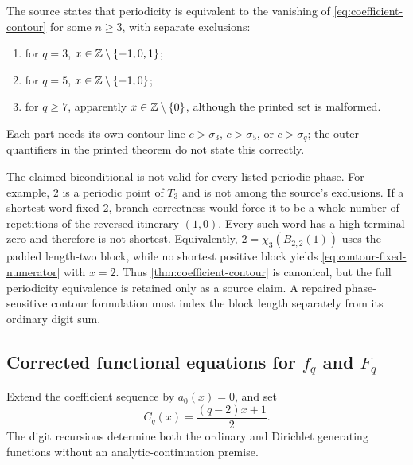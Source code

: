 \begin{status}
The source states that periodicity is equivalent to the vanishing of
\cref{eq:coefficient-contour} for some $n\geq3$, with separate exclusions:
\begin{enumerate}[label=\textup{(\roman*)}]
\item for $q=3$, $x\in\mathbb Z\setminus\{-1,0,1\}$;
\item for $q=5$, $x\in\mathbb Z\setminus\{-1,0\}$;
\item for $q\geq7$, apparently $x\in\mathbb Z\setminus\{0\}$, although the
      printed set is malformed.
\end{enumerate}
Each part needs its own contour line $c>\sigma_3$, $c>\sigma_5$, or
$c>\sigma_q$; the outer quantifiers in the printed theorem do not state
this correctly.
\end{status}

\begin{sourceissue}
The claimed biconditional is not valid for every listed periodic phase.
For example, $2$ is a periodic point of $T_3$ and is not among the source's
exclusions.  If a shortest word fixed $2$, branch correctness would force it
to be a whole number of repetitions of the reversed itinerary $(1,0)$.
Every such word has a high terminal zero and therefore is not shortest.
Equivalently, $2=\chi_3(B_{2,2}(1))$ uses the padded length-two block, while
no shortest positive block yields \cref{eq:contour-fixed-numerator} with
$x=2$.  Thus \cref{thm:coefficient-contour} is canonical, but the full
periodicity equivalence is retained only as a source claim.  A repaired
phase-sensitive contour formulation must index the block length separately
from its ordinary digit sum.
\end{sourceissue}

\subsection{Corrected functional equations for \texorpdfstring{$f_q$ and
$F_q$}{fq and Fq}}

Extend the coefficient sequence by $a_0(x)=0$, and set
\begin{equation}
 \label{eq:Fq-C}
 C_q(x)=\frac{(q-2)x+1}{2}.
\end{equation}
The digit recursions determine both the ordinary and Dirichlet generating
functions without an analytic-continuation premise.

